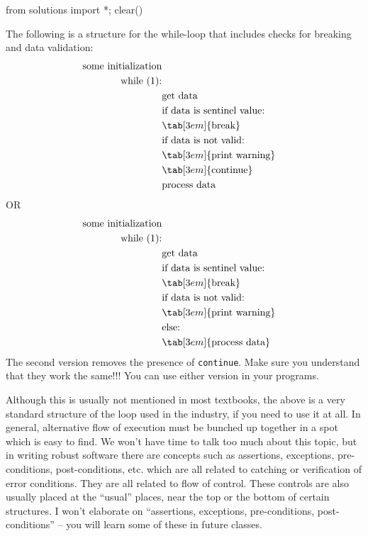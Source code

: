 \begin{python0}
from solutions import *; clear()
\end{python0}

The following is a structure for the while-loop that includes checks for
breaking and data validation:
\begin{align*}
\text{some initialization}\\
\text{while (1):}\\
&\text{get data}\\
&\text{if data is sentinel value:}\\
&\tab[3em]{\text{break}}\\
&\text{if data is not valid:}\\
&\tab[3em]{\text{print warning}}\\
&\tab[3em]{\text{continue}}\\
&\text{process data}\\
\end{align*}
OR
\begin{align*}
\text{some initialization}\\
\text{while (1):}\\
&\text{get data}\\
&\text{if data is sentinel value:}\\
&\tab[3em]{\text{break}}\\
&\text{if data is not valid:}\\
&\tab[3em]{\text{print warning}}\\
&\text{else:}\\
&\tab[3em]{\text{process data}}\\
\end{align*}
The second version removes the presence of \texttt{continue}. Make sure
you understand that they work the same!!! You can use either version in
your programs.


Although this is usually not mentioned in most textbooks, the above is a
very standard structure of the loop used in the industry, if you need to
use it at all. In general, alternative flow of execution must be bunched
up together in a spot which is easy to find. We won't
have time to talk too much about this topic, but in writing robust
software there are concepts such as assertions, exceptions,
pre-conditions, post-conditions, etc. which are all related to catching
or verification of error conditions. They are all related to flow of
control. These controls are also usually placed at the ``usual'' places,
near the top or the bottom of certain structures. I
won't elaborate on ``assertions, exceptions,
pre-conditions, post-conditions'' -- you will learn some of these in
future classes.

